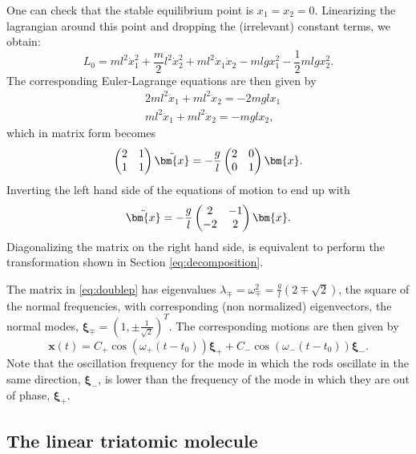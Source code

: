 \documentclass[english,fontsize=11pt,paper=a5,oneside]{scrbook}
\newcommand{\bx}{\bm{x}}
\theoremstyle{definition}
\begin{document}
One can check that the stable equilibrium point is $x_1 = x_2 = 0$.
Linearizing the lagrangian around this point and dropping the (irrelevant) constant terms, we obtain:
\begin{equation}
  L_0 = m l^2 \dot x_1^2
  + \frac m2 l^2 \dot x_2^2
  + m l^2 \dot x_1 \dot x_2
  - ml g x_1^2
  - \frac12 mlg x_2^2.
\end{equation}
The corresponding Euler-Lagrange equations are then given by
\begin{align}
   & 2ml^2 \ddot x_1 + ml^2 \ddot x_2 = -2mgl x_1 \\
   & ml^2 \ddot x_1 + ml^2 \ddot x_2 = -mgl x_2,
\end{align}
which in matrix form becomes
\begin{equation}
  \begin{pmatrix}2&1\\1&1\end{pmatrix} \ddot\bx
  = - \frac gl \begin{pmatrix}2&0\\0&1\end{pmatrix} \bx.
\end{equation}
Inverting the left hand side of the equations of motion to end up with
\begin{equation}\label{eq:doublep}
  \ddot \bx = - \frac gl \begin{pmatrix}2&-1\\-2&2\end{pmatrix} \bx.
\end{equation}
Diagonalizing the matrix on the right hand side, is equivalent to perform the transformation shown in Section \ref{eq:decomposition}.

The matrix in \eqref{eq:doublep} has eigenvalues $\lambda_\mp = \omega_\mp^2 = \frac{g}l \left(2\mp \sqrt{2}\right)$, the square of the normal frequencies, with corresponding (non normalized) eigenvectors, the normal modes, $\bm{\xi}_\mp = \left(1, \pm \frac1{\sqrt{2}}\right)^T$.
The corresponding motions are then given by
\begin{equation}
  \bx(t) = C_+  \cos (\omega_+ (t - t_0)) \bm{\xi}_+ + C_- \cos (\omega_- (t - t_0)) \bm{\xi}_-.
\end{equation}
Note that the oscillation frequency for the mode in which the rods oscillate in the same direction, $\bm{\xi}_-$, is lower than the frequency of the mode in which they are out of phase, $\bm{\xi}_+$.

\subsection{The linear triatomic molecule}\label{sec:triatomic}
\end{document}
